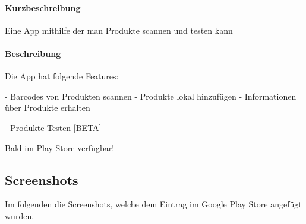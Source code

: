 \documentclass{scrartcl}
\begin{document}
\paragraph{Kurzbeschreibung} \mbox{} \newline 
\noindent Eine App mithilfe der man Produkte scannen und testen kann 

\paragraph{Beschreibung} \mbox{} \newline 
\noindent Die App hat folgende Features: \newline 

\noindent - Barcodes von Produkten scannen \newline 
\noindent - Produkte lokal hinzufügen \newline 
\noindent - Informationen über Produkte erhalten \newline 

\noindent - Produkte Testen [BETA] \newline 

\noindent Bald im Play Store verfügbar! \newline

\subsection{Screenshots}

Im folgenden die Screenshots, welche dem Eintrag im Google Play Store angefügt wurden. \newline 
\end{document}
